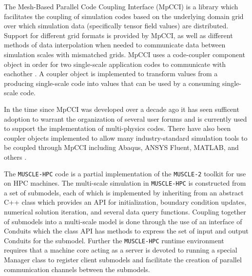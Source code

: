 \documentclass[review]{siamart1116}
\newcommand{\red}[1]{\textcolor{red}{[#1]}}
\begin{document}
The Mesh-Based Parallel Code Coupling Interface (MpCCI) \cite{joppich2006mpcci} is a library which facilitates the coupling of simulation codes based on the underlying domain grid over which simulation data (specifically tensor field values) are distributed. Support for different grid formats is provided by MpCCI, as well as different methods of data interpolation when needed to communicate data between simulation scales with mismatched grids. MpCCI uses a code-coupler component object in order for two single-scale application codes to communicate with eachother \cite{delalondre2010collaborative}. A coupler object is implemented to transform values from a producing single-scale code into values that can be used by a consuming single-scale code.

In the time since MpCCI was developed over a decade ago it has seen sufficent adoption to warrant the organization of several user forums and is currently used to support the implementation of multi-physics codes. There have also been coupler objects implemented to allow many industry-standard simulation tools to be coupled through MpCCI including Abaqus, ANSYS Fluent, MATLAB, and others \cite{mpcci-website}.

The \verb=MUSCLE-HPC= \cite{belgacem2017muscle} code is a partial implementation of the \verb=MUSCLE-2= toolkit \cite{borgdorff2014distributed} for use on HPC machines. The multi-scale simulation in \verb=MUSCLE-HPC= is constructed from a set of submodels, each of which is implemented by inheriting from an abstract C++ class which provides an API for initialization, boundary condition updates, numerical solution iteration, and several data query functions. Coupling together of submodels into a multi-scale model is done through the use of an interface of Conduits which the class API has methods to express the set of input and output Conduits for the submodel. Further the \verb=MUSCLE-HPC= runtime environment requires that a machine core acting as a server is devoted to running a special Manager class to register client submodels and facilitate the creation of parallel communication channels between the submodels. 




\end{document}
